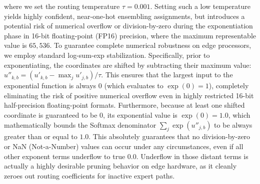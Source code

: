 where we set the routing temperature $\tau = 0.001$. Setting such a low temperature yields highly confident, near-one-hot ensembling assignments, but introduces a potential risk of numerical overflow or division-by-zero during the exponentiation phase in 16-bit floating-point (FP16) precision, where the maximum representable value is $65,536$. To guarantee complete numerical robustness on edge processors, we employ standard log-sum-exp stabilization. Specifically, prior to exponentiating, the coordinates are shifted by subtracting their maximum value: $u''_{k, b} = (u'_{k, b} - \max_j u'_{j, b}) / \tau$. This ensures that the largest input to the exponential function is always $0$ (which evaluates to $\exp(0)=1$), completely eliminating the risk of positive numerical overflow even in highly restricted 16-bit half-precision floating-point formats. Furthermore, because at least one shifted coordinate is guaranteed to be $0$, its exponential value is $\exp(0) = 1.0$, which mathematically bounds the Softmax denominator $\sum_j \exp(u''_{j, b})$ to be always greater than or equal to $1.0$. This absolutely guarantees that no division-by-zero or NaN (Not-a-Number) values can occur under any circumstances, even if all other exponent terms underflow to true $0.0$. Underflow in those distant terms is actually a highly desirable pruning behavior on edge hardware, as it cleanly zeroes out routing coefficients for inactive expert paths.

